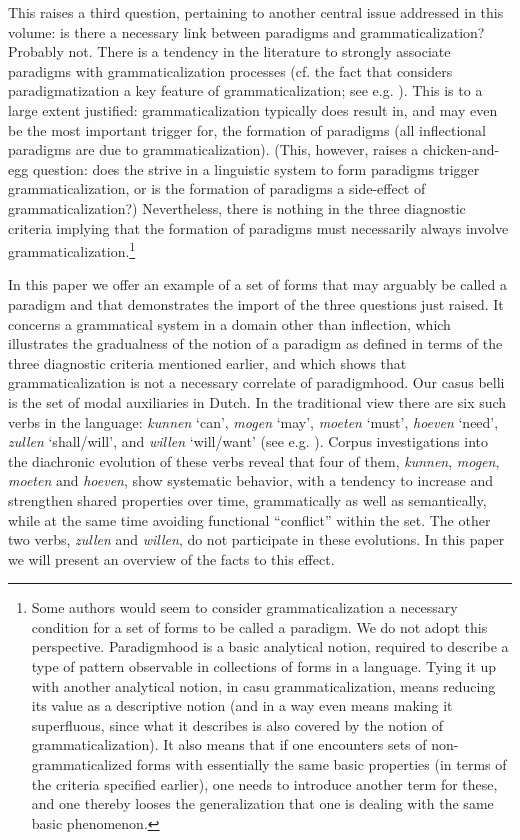\documentclass[output=paper]{langsci/langscibook}
\begin{document}
This raises a third question, pertaining to another central issue addressed in this volume: is there a necessary link between paradigms and grammaticalization? Probably not. There is a tendency in the literature to strongly associate paradigms with grammaticalization processes (cf. the fact that \citealt{Lehmann1982} considers paradigmatization a key feature of grammaticalization; see e.g. \citealt{Diewald2009, Nørgård-Sørensen2011}). This is to a large extent justified: grammaticalization typically does result in, and may even be the most important trigger for, the formation of  paradigms (all inflectional paradigms are due to grammaticalization). (This, however, raises a chicken-and-egg question: does the strive in a linguistic system to form paradigms trigger grammaticalization, or is the formation of paradigms a side-effect of grammaticalization?) Nevertheless, there is nothing in the three diagnostic criteria implying that the formation of paradigms must necessarily always involve grammaticalization.\footnote{Some authors would seem to consider grammaticalization a necessary condition for a set of forms to be called a paradigm. We do not adopt this perspective. Paradigmhood is a basic analytical notion, required to describe a type of pattern observable in collections of forms in a language. Tying it up with another analytical notion, in casu grammaticalization, means reducing its value as a descriptive notion (and in a way even means making it superfluous, since what it describes is also covered by the notion of grammaticalization). It also means that if one encounters sets of non-grammaticalized forms with essentially the same basic properties (in terms of the criteria specified earlier), one needs to introduce another term for these, and one thereby looses the generalization that one is dealing with the same basic phenomenon.} 

In this paper we offer an example of a set of forms that may arguably be called a paradigm and that demonstrates the import of the three questions just raised. It concerns a grammatical system in a domain other than inflection, which illustrates the gradualness of the notion of a paradigm as defined in terms of the three diagnostic criteria mentioned earlier, and which shows that grammaticalization is not a necessary correlate of paradigmhood. Our casus belli is the set of modal auxiliaries in Dutch. In the traditional view there are six such verbs in the language: \textit{kunnen} ‘can’, \textit{mogen} ‘may’, \textit{moeten} ‘must’, \textit{hoeven} ‘need’, \textit{zullen} ‘shall/will’, and \textit{willen} ‘will/want’ (see e.g. \citealt[383--437]{Duinhoven1997}). Corpus investigations into the diachronic evolution of these verbs reveal that four of them, \textit{kunnen}, \textit{mogen}, \textit{moeten} and \textit{hoeven}, show systematic behavior, with a tendency to increase and strengthen shared properties over time, grammatically as well as semantically, while at the same time avoiding functional “conflict” within the set. The other two verbs, \textit{zullen} and \textit{willen}, do not participate in these evolutions. In this paper we will present an overview of the facts to this effect.
\end{document}
